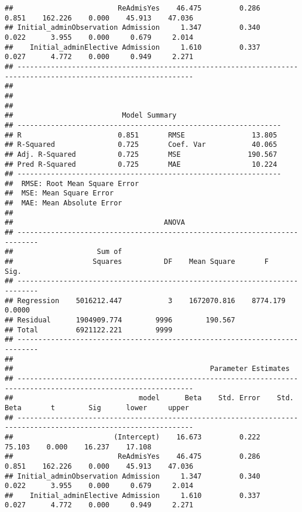 \documentclass[
]{article}
\begin{document}
\begin{verbatim}
##                         ReAdmisYes    46.475         0.286        0.851    162.226    0.000    45.913    47.036 
## Initial_adminObservation Admission     1.347         0.340        0.022      3.955    0.000     0.679     2.014 
##    Initial_adminElective Admission     1.610         0.337        0.027      4.772    0.000     0.949     2.271 
## ----------------------------------------------------------------------------------------------------------------
## 
## 
## 
##                          Model Summary                          
## ---------------------------------------------------------------
## R                       0.851       RMSE                13.805 
## R-Squared               0.725       Coef. Var           40.065 
## Adj. R-Squared          0.725       MSE                190.567 
## Pred R-Squared          0.725       MAE                 10.224 
## ---------------------------------------------------------------
##  RMSE: Root Mean Square Error 
##  MSE: Mean Square Error 
##  MAE: Mean Absolute Error 
## 
##                                    ANOVA                                    
## ---------------------------------------------------------------------------
##                    Sum of                                                  
##                   Squares          DF    Mean Square       F          Sig. 
## ---------------------------------------------------------------------------
## Regression    5016212.447           3    1672070.816    8774.179    0.0000 
## Residual      1904909.774        9996        190.567                       
## Total         6921122.221        9999                                      
## ---------------------------------------------------------------------------
## 
##                                               Parameter Estimates                                                
## ----------------------------------------------------------------------------------------------------------------
##                              model      Beta    Std. Error    Std. Beta       t        Sig      lower     upper 
## ----------------------------------------------------------------------------------------------------------------
##                        (Intercept)    16.673         0.222                  75.103    0.000    16.237    17.108 
##                         ReAdmisYes    46.475         0.286        0.851    162.226    0.000    45.913    47.036 
## Initial_adminObservation Admission     1.347         0.340        0.022      3.955    0.000     0.679     2.014 
##    Initial_adminElective Admission     1.610         0.337        0.027      4.772    0.000     0.949     2.271 

\end{verbatim}
\end{document}
